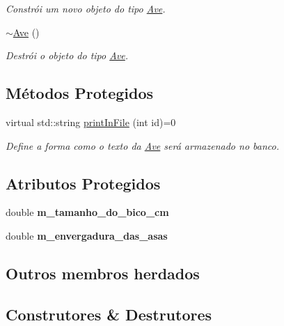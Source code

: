 \begin{DoxyCompactItemize}
\begin{DoxyCompactList}\small\item\em Constrói um novo objeto do tipo \hyperlink{classAve}{Ave}. \end{DoxyCompactList}\item 
\mbox{\label{classAve_ad290be8d6fb95f1cfd24b5f55def7741}} 
\hyperlink{classAve_ad290be8d6fb95f1cfd24b5f55def7741}{$\sim$\+Ave} ()
\begin{DoxyCompactList}\small\item\em Destrói o objeto do tipo \hyperlink{classAve}{Ave}. \end{DoxyCompactList}\end{DoxyCompactItemize}
\subsection*{Métodos Protegidos}
\begin{DoxyCompactItemize}
\item 
virtual std\+::string \hyperlink{classAve_ab858405e18c56876e331ad943885ee53}{print\+In\+File} (int id)=0
\begin{DoxyCompactList}\small\item\em Define a forma como o texto da \hyperlink{classAve}{Ave} será armazenado no banco. \end{DoxyCompactList}\end{DoxyCompactItemize}
\subsection*{Atributos Protegidos}
\begin{DoxyCompactItemize}
\item 
\mbox{\label{classAve_a6b226ae4077430877b040141105a9890}} 
double {\bfseries m\+\_\+tamanho\+\_\+do\+\_\+bico\+\_\+cm}
\item 
\mbox{\label{classAve_a6261373aae903e524e220e53ded18693}} 
double {\bfseries m\+\_\+envergadura\+\_\+das\+\_\+asas}
\end{DoxyCompactItemize}
\subsection*{Outros membros herdados}


\subsection{Construtores \& Destrutores}
\mbox{\label{classAve_aa1a19a4a964c41107df2886261f055e8}} 
